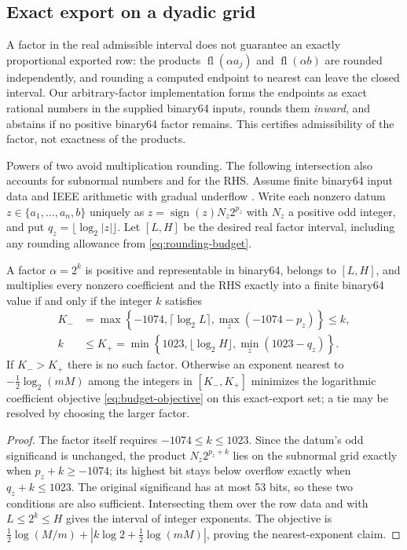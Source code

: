 \subsection{Exact export on a dyadic grid}
A factor in the real admissible interval does not guarantee an exactly proportional exported
row: the products $\operatorname{fl}(\alpha a_j)$ and $\operatorname{fl}(\alpha b)$ are rounded
independently, and rounding a computed endpoint to nearest can leave the closed interval. Our
arbitrary-factor implementation forms the endpoints as exact rational numbers in the supplied
binary64 inputs, rounds them \emph{inward}, and abstains if no positive binary64 factor
remains. This certifies admissibility of the factor, not exactness of the products.

Powers of two avoid multiplication rounding. The following intersection also accounts for
subnormal numbers and for the RHS. Assume finite binary64 input data and IEEE arithmetic with
gradual underflow \cite{ieee2019float}. Write each nonzero datum $z\in\{a_1,\ldots,a_n,b\}$
uniquely as $z=\operatorname{sign}(z)N_z2^{p_z}$ with $N_z$ a positive odd integer, and put
$q_z=\lfloor\log_2|z|\rfloor$. Let $[L,H]$ be the desired real factor interval, including any
rounding allowance from \eqref{eq:rounding-budget}.

\begin{proposition}
\label{prop:dyadic}
A factor $\alpha=2^k$ is positive and representable in binary64, belongs to
$[L,H]$, and multiplies every nonzero coefficient and the RHS exactly into a
finite binary64 value if and only if the integer $k$ satisfies
\begin{align*}
 K_-&=\max\left\{-1074,\lceil\log_2L\rceil,
                    \max_z(-1074-p_z)\right\}\le k,\\
 k&\le K_+=\min\left\{1023,\lfloor\log_2H\rfloor,
                    \min_z(1023-q_z)\right\}.
\end{align*}
If $K_->K_+$ there is no such factor. Otherwise an exponent nearest to
$-\tfrac12\log_2(mM)$ among the integers in $[K_-,K_+]$ minimizes the
logarithmic coefficient objective \eqref{eq:budget-objective} on this exact-export
set; a tie may be resolved by choosing the larger factor.
\end{proposition}
\begin{proof}
The factor itself requires $-1074\le k\le1023$. Since the datum's odd
significand is unchanged, the product $N_z2^{p_z+k}$ lies on the subnormal grid
exactly when $p_z+k\ge-1074$; its highest bit stays below overflow exactly when
$q_z+k\le1023$. The original significand has at most 53 bits, so these two
conditions are also sufficient. Intersecting them over the row data and with
$L\le2^k\le H$ gives the interval of integer exponents. The objective is
$\tfrac12\log(M/m)+|k\log2+\tfrac12\log(mM)|$, proving the nearest-exponent
claim.
\end{proof}

